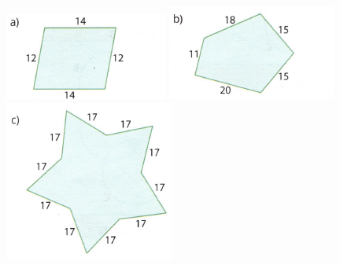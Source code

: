 \documentclass[a4paper,14pt]{article}
\begin{document}
\begin{multicols}{2}
\begin{enumerate}
			\includegraphics[width=1\linewidth]{6FMA89_imagens/imagem12}
			\includegraphics[width=1\linewidth]{6FMA89_imagens/imagem13}
			\includegraphics[width=1\linewidth]{6FMA89_imagens/imagem14}

\end{enumerate}
\end{multicols}
\end{document}
